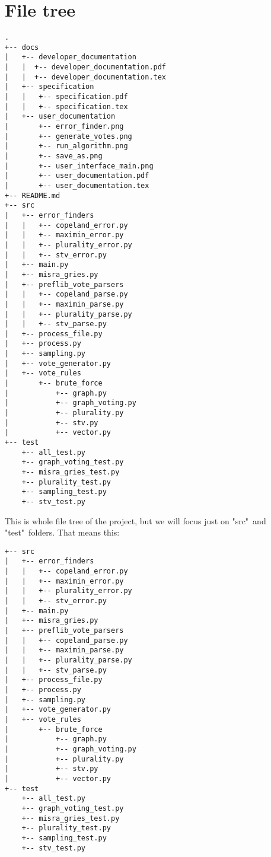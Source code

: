 \documentclass[a4paper,12pt]{report}
\begin{document}
	\pagestyle{toc}
	\tableofcontents
	\cleardoublepage
	\pagestyle{plain}
	\pagebreak
	
	\chapter{File tree}
	
	\begin{Verbatim}[fontsize=\small]
.
+-- docs
|	+-- developer_documentation
|	|  +-- developer_documentation.pdf
|	|  +-- developer_documentation.tex
|   +-- specification
|   |   +-- specification.pdf
|   |   +-- specification.tex
|   +-- user_documentation
|       +-- error_finder.png
|       +-- generate_votes.png
|       +-- run_algorithm.png
|       +-- save_as.png
|       +-- user_interface_main.png
|       +-- user_documentation.pdf
|       +-- user_documentation.tex
+-- README.md
+-- src
|   +-- error_finders
|   |   +-- copeland_error.py
|   |   +-- maximin_error.py
|   |   +-- plurality_error.py
|   |   +-- stv_error.py
|   +-- main.py
|   +-- misra_gries.py
|   +-- preflib_vote_parsers
|   |   +-- copeland_parse.py
|   |   +-- maximin_parse.py
|   |   +-- plurality_parse.py
|   |   +-- stv_parse.py
|   +-- process_file.py
|   +-- process.py
|   +-- sampling.py
|   +-- vote_generator.py
|   +-- vote_rules
|       +-- brute_force
|           +-- graph.py
|           +-- graph_voting.py
|           +-- plurality.py
|           +-- stv.py
|           +-- vector.py
+-- test
	+-- all_test.py
	+-- graph_voting_test.py
	+-- misra_gries_test.py
	+-- plurality_test.py
	+-- sampling_test.py
	+-- stv_test.py
	\end{Verbatim}
	
	This is whole file tree of the project, but we will focus just on "src"\ and "test"\ folders. That means this:
	
	\newpage
	
		\begin{Verbatim}[fontsize=\small]
+-- src
|   +-- error_finders
|   |   +-- copeland_error.py
|   |   +-- maximin_error.py
|   |   +-- plurality_error.py
|   |   +-- stv_error.py
|   +-- main.py
|   +-- misra_gries.py
|   +-- preflib_vote_parsers
|   |   +-- copeland_parse.py
|   |   +-- maximin_parse.py
|   |   +-- plurality_parse.py
|   |   +-- stv_parse.py
|   +-- process_file.py
|   +-- process.py
|   +-- sampling.py
|   +-- vote_generator.py
|   +-- vote_rules
|       +-- brute_force
|           +-- graph.py
|           +-- graph_voting.py
|           +-- plurality.py
|           +-- stv.py
|           +-- vector.py
+-- test
	+-- all_test.py
	+-- graph_voting_test.py
	+-- misra_gries_test.py
	+-- plurality_test.py
	+-- sampling_test.py
	+-- stv_test.py
	\end{Verbatim}
	
\end{document}
